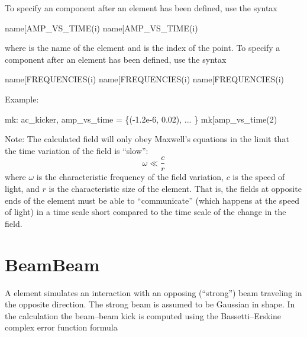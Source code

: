 To specify an  component after an  element has been defined, use the
syntax
\begin{example}
  name[AMP_VS_TIME(i)%
  name[AMP_VS_TIME(i)%
\end{example}
where  is the name of the element and  is the index of the point.
To specify a  component after an  element has been defined, use the
syntax
\begin{example}
  name[FREQUENCIES(i)%
  name[FREQUENCIES(i)%
  name[FREQUENCIES(i)%
\end{example}
Example:
\begin{example}
  mk: ac_kicker, amp_vs_time = \{(-1.2e-6, 0.02), ... \} 
  mk[amp_vs_time(2)%
\end{example}

Note: The calculated field will only obey Maxwell's equations in the limit that the time variation
of the field is ``slow'':
\begin{equation}
  \omega \ll \frac{c}{r}
\end{equation}
where $\omega$ is the characteristic frequency of the field variation, $c$ is the speed of light,
and $r$ is the characteristic size of the  element. That is, the fields at opposite
ends of the element must be able to ``communicate'' (which happens at the speed of light) in a time
scale short compared to the time scale of the change in the field.

\section{BeamBeam}
\label{s:bbi}

A  element simulates an interaction with an opposing
(``strong'') beam traveling in the opposite direction. The strong beam
is assumed to be Gaussian in shape. In the 
calculation the beam--beam kick is computed using the
Bassetti--Erskine complex error function formula\cite{b:talman}


